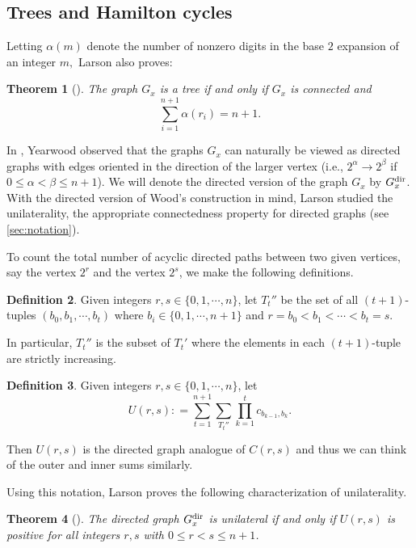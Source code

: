 \documentclass{amsart}
\newtheorem{theorem}{Theorem}[section]
\theoremstyle{definition}
\newtheorem{deff}[theorem]{Definition}
\theoremstyle{plain}
\numberwithin{theorem}{section}
\numberwithin{equation}{section}
\numberwithin{figure}{section}
\newcommand{\0}{\langle 0 \rangle }
\begin{document}
\subsection{Trees and Hamilton cycles}

Letting $\alpha (m)$ denote the number of nonzero digits in the base $2$ expansion of an integer $m,$ Larson also proves:
\begin{theorem}[{\cite[Theorem 1.2]{Larson22}}]
    The graph $G_x$ is a tree if and only if $G_x$ is connected and 
    \[
    \sum_{i=1}^{n + 1} \alpha(r_i) = n + 1.
    \]
\end{theorem}

In \cite{Yearwood19}, Yearwood observed that the graphs $G_x$ can naturally be viewed as directed graphs with edges oriented in the direction of the larger vertex (i.e., $2^\alpha \to 2^\beta$ if $0 \leq \alpha < \beta \leq n + 1$). We will denote the directed version of the graph $G_x$ by $G_x^{\textup{dir}}$. With the directed version of Wood's construction in mind, Larson studied the unilaterality, the appropriate connectedness property for directed graphs (see \cref{sec:notation}). { To count the total number of acyclic directed paths between two given vertices, say the vertex $2^r$ and the vertex $2^s$, we make the following definitions. 

\begin{deff}\label{def:T''t}
     Given integers $r, s \in \{0,1, \cdots, n\}$, let $T_t''$ be the set of all $(t + 1)$-tuples $(b_0, b_1, \cdots, b_t)$ where $b_i \in \{ 0, 1, \cdots, n + 1\}$ and $r = b_0 < b_1 < \cdots < b_t = s$.
\end{deff}
In particular, $T_t''$ is the subset of $T_t'$ where the elements in each $(t + 1)$-tuple are strictly increasing. 
\begin{deff} 
    Given integers $r, s \in \{0,1, \cdots, n\}$, let 
    \[
    {U(r,s)}: = \sum_{t = 1}^{n + 1} \sum_{{T}_t''} \prod_{k = 1}^t c_{b_{k - 1} , b_k}.
    \]
\end{deff}
Then $U(r,s)$ is the directed graph analogue of $C(r,s)$ and thus we can think of the outer and inner sums similarly. 

Using this notation, Larson proves the following characterization of unilaterality.}

\begin{theorem}[{\cite[Theorem 1.3]{Larson22}}]
    The directed graph $G_x^\textup{dir}$ is unilateral if and only if ${U(r,s)}$
    is positive for all integers $r,s$ with $0 \leq r < s \leq n + 1$.
\end{theorem}
\end{document}
